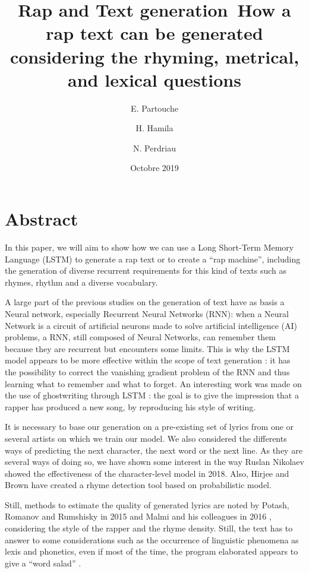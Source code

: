 \documentclass[12pt,a4paper]{article}
\title{Rap and Text generation\newline\ How a rap text can be generated considering the rhyming, metrical, and lexical questions}
\date{Octobre 2019}
\author{E. Partouche \and H. Hamila \and N. Perdriau}
\begin{document}
\maketitle
\tableofcontents
\newpage

\section{Abstract}

In this paper, we will aim to show how we can use a Long Short-Term Memory Language (LSTM) to generate a rap text or to create a “rap machine”, including the generation of diverse recurrent requirements for this kind of texts such as rhymes, rhythm and a diverse vocabulary. \newline

A large part of the previous studies on the generation of text \cite{sutskever_generating_nodate} have as basis a Neural network, especially Recurrent Neural Networks (RNN): when a Neural Network is a circuit of artificial neurons made to solve artificial intelligence (AI) problems, a RNN, still composed of Neural Networks, can remember them because they are recurrent but encounters some limits. This is why the LSTM model appears to be more effective within the scope of text generation : it has the possibility to correct the vanishing gradient problem of the RNN and thus learning what to remember and what to forget. An interesting work was made on the use of ghostwriting through LSTM  \cite{potash_ghostwriter:_2015} : the goal is to give the impression that a rapper has produced a new song, by reproducing his style of writing. \newline

It is necessary to base our generation on a pre-existing set of lyrics from one or several artists on which we train our model. We also considered the differents ways of predicting the next character, the next word or the next line. As they are several ways of doing so, we have shown some interest in the way Ruslan Nikolaev \cite{nikolaev_generating_2018} showed the effectiveness of the character-level model in 2018. Also, Hirjee and Brown have created a rhyme detection tool based on probabilistic model.\cite{hirjee_using_2010} \newline

Still, methods to estimate the quality of generated lyrics are noted by Potash, Romanov and Rumshisky in 2015 and Malmi and his colleagues in 2016 \cite{malmi_dopelearning:_2016}, considering the style of the rapper and the rhyme density. Still, the text has to answer to some considerations such as the occurrence of linguistic phenomena as lexis and phonetics, even if most of the time, the program elaborated appears to give a “word salad”   \cite{oliveira_automatic_nodate}. \newline
\end{document}
